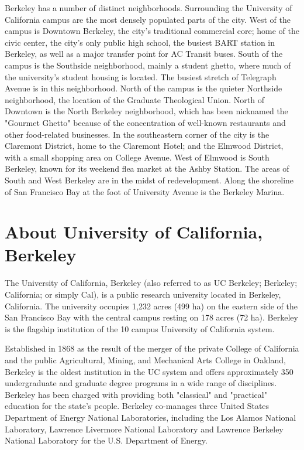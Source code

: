 Berkeley has a number of distinct neighborhoods. Surrounding the University of California campus are the most densely populated parts of the city. West of the campus is Downtown Berkeley, the city's traditional commercial core; home of the civic center, the city's only public high school, the busiest BART station in Berkeley, as well as a major transfer point for AC Transit buses. South of the campus is the Southside neighborhood, mainly a student ghetto, where much of the university's student housing is located. The busiest stretch of Telegraph Avenue is in this neighborhood. North of the campus is the quieter Northside neighborhood, the location of the Graduate Theological Union. North of Downtown is the North Berkeley neighborhood, which has been nicknamed the "Gourmet Ghetto" because of the concentration of well-known restaurants and other food-related businesses. In the southeastern corner of the city is the Claremont District, home to the Claremont Hotel; and the Elmwood District, with a small shopping area on College Avenue. West of Elmwood is South Berkeley, known for its weekend flea market at the Ashby Station. The areas of South and West Berkeley are in the midst of redevelopment. Along the shoreline of San Francisco Bay at the foot of University Avenue is the Berkeley Marina. 

\vspace{3mm}
\section*{About University of California, Berkeley}

The University of California, Berkeley (also referred to as UC Berkeley; Berkeley; California; or simply Cal), is a public research university located in Berkeley, California. The university occupies 1,232 acres (499 ha) on the eastern side of the San Francisco Bay with the central campus resting on 178 acres (72 ha). Berkeley is the flagship institution of the 10 campus University of California system.

Established in 1868 as the result of the merger of the private College of California and the public Agricultural, Mining, and Mechanical Arts College in Oakland, Berkeley is the oldest institution in the UC system and offers approximately 350 undergraduate and graduate degree programs in a wide range of disciplines. Berkeley has been charged with providing both "classical" and "practical" education for the state's people. Berkeley co-manages three United States Department of Energy National Laboratories, including the Los Alamos National Laboratory, Lawrence Livermore National Laboratory and Lawrence Berkeley National Laboratory for the U.S. Department of Energy.

